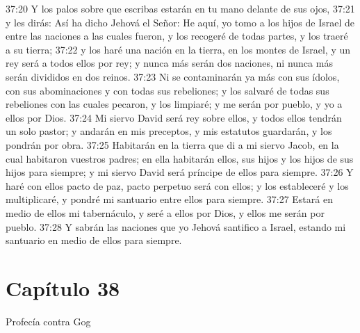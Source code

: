 37:20 Y los palos sobre que escribas estarán en tu mano delante de sus ojos,   
37:21 y les dirás: Así ha dicho Jehová el Señor: He aquí, yo tomo a los hijos de Israel de entre las naciones a las cuales fueron, y los recogeré de todas partes, y los traeré a su tierra;   
37:22 y los haré una nación en la tierra, en los montes de Israel, y un rey será a todos ellos por rey; y nunca más serán dos naciones, ni nunca más serán divididos en dos reinos.   
37:23 Ni se contaminarán ya más con sus ídolos, con sus abominaciones y con todas sus rebeliones; y los salvaré de todas sus rebeliones con las cuales pecaron, y los limpiaré; y me serán por pueblo, y yo a ellos por Dios.   
37:24 Mi siervo David será rey sobre ellos, y todos ellos tendrán un solo pastor; y andarán en mis preceptos, y mis estatutos guardarán, y los pondrán por obra.   
37:25 Habitarán en la tierra que di a mi siervo Jacob, en la cual habitaron vuestros padres; en ella habitarán ellos, sus hijos y los hijos de sus hijos para siempre; y mi siervo David será príncipe de ellos para siempre.   
37:26 Y haré con ellos pacto de paz, pacto perpetuo será con ellos; y los estableceré y los multiplicaré, y pondré mi santuario entre ellos para siempre.   
37:27 Estará en medio de ellos mi tabernáculo, y seré a ellos por Dios, y ellos me serán por pueblo. 
37:28 Y sabrán las naciones que yo Jehová santifico a Israel, estando mi santuario en medio de ellos para siempre.   
\section*{Capítulo 38 } 
Profecía contra Gog   
  
